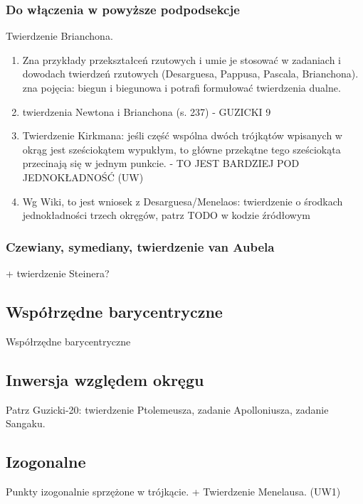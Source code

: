 \subsubsection{Do włączenia w powyższe podpodsekcje}
Twierdzenie Brianchona.
\begin{enumerate}
    \item Zna przykłady przekształceń rzutowych i umie je stosować w zadaniach i dowodach twierdzeń rzutowych (Desarguesa, Pappusa, Pascala, Brianchona). zna pojęcia: biegun i biegunowa i potrafi formułować twierdzenia dualne.  
    \item twierdzenia Newtona i Brianchona (s. 237) - GUZICKI 9
    \item Twierdzenie Kirkmana: jeśli część wspólna dwóch trójkątów wpisanych w okrąg jest sześciokątem wypukłym, to główne przekątne tego sześciokąta przecinają się w jednym punkcie. - TO JEST BARDZIEJ POD JEDNOKŁADNOŚĆ (UW)
    \item Wg Wiki, to jest wniosek z Desarguesa/Menelaos: twierdzenie o środkach jednokładności trzech okręgów, patrz TODO w kodzie źródłowym %
\end{enumerate}

\subsubsection{Czewiany, symediany, twierdzenie van Aubela}
+ twierdzenie Steinera?

\subsection{Współrzędne barycentryczne}
Współrzędne barycentryczne

\subsection{Inwersja względem okręgu}
Patrz Guzicki-20: twierdzenie Ptolemeusza, zadanie Apolloniusza, zadanie Sangaku.

\subsection{Izogonalne}
Punkty izogonalnie sprzężone w trójkącie. + Twierdzenie Menelausa. (UW1)